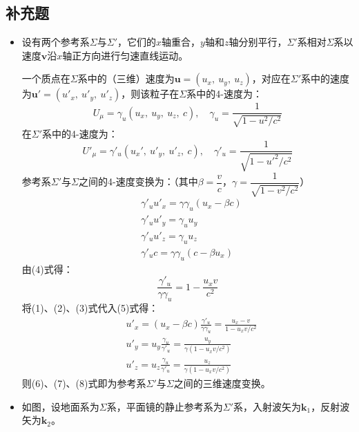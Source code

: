 \documentclass[a4paper,fontset=none]{ctexart}
\begin{document}
\subsection*{补充题}

\begin{itemize}

    \item[4.]
    \setcounter{equation}{0}
    设有两个参考系$\varSigma$与$\varSigma'$，它们的$x$轴重合，$y$轴和$z$轴分别平行，$\varSigma'$系相对$\varSigma$系以速度$\bm{v}$沿$x$轴正方向进行匀速直线运动。

    一个质点在$\varSigma$系中的（三维）速度为$\bm{u}=(u_x,\ u_y,\ u_z)$，对应在$\varSigma'$系中的速度为$\bm{u}'=(u'_x,\ u'_y,\ u'_z)$，则该粒子在$\varSigma$系中的4-速度为：
    \[
        U_\mu = \gamma_u(u_x,\ u_y,\ u_z,\ c),\quad \gamma_u = \frac{1}{\sqrt{1-u^2/c^2}}
    \]
    在$\varSigma'$系中的4-速度为：
    \[
        U'_\mu = \gamma'_u(u_x',\ u'_y,\ u'_z,\ c),\quad \gamma'_u = \frac{1}{\sqrt{1-{u'}^2/c^2}}
    \]
    参考系$\varSigma'$与$\varSigma$之间的4-速度变换为：（其中$\beta=\dfrac{v}{c}$，$\gamma=\dfrac{1}{\sqrt{1-v^2/c^2}}$）
    \begin{align}
        &\gamma'_u u'_x = \gamma\gamma_u(u_x - \beta c) \\
        &\gamma'_u u'_y = \gamma_u u_y \\
        &\gamma'_u u'_z = \gamma_u u_z \\
        &\gamma'_u c = \gamma \gamma_u(c - \beta u_x)
    \end{align}
    由(4)式得：
    \begin{equation}
        \frac{\gamma'_u}{\gamma\gamma_u} = 1 - \frac{u_x v}{c^2}
    \end{equation}
    将(1)、(2)、(3)式代入(5)式得：
    \begin{align}
        &u'_x = (u_x - \beta c)\frac{\gamma'_u}{\gamma\gamma_u} = \frac{u_x - v}{1 - u_x v/c^2} \\
        &u'_y = u_y\frac{\gamma_u}{\gamma'_u} = \frac{u_y}{\gamma(1-u_x v/c^2)} \\
        &u'_z = u_z\frac{\gamma_u}{\gamma'_u} = \frac{u_z}{\gamma(1-u_x v/c^2)}
    \end{align}
    则(6)、(7)、(8)式即为参考系$\varSigma'$与$\varSigma$之间的三维速度变换。

    \item[7.]
    如图，设地面系为$\varSigma$系，平面镜的静止参考系为$\varSigma'$系，入射波矢为$\bm{k}_1$，反射波矢为$\bm{k}_2$。


\end{itemize}
\end{document}

